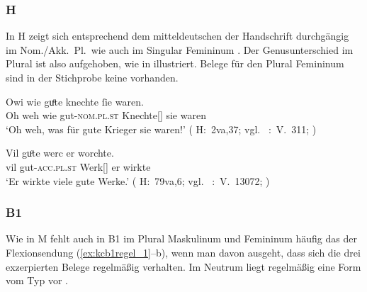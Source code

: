 \subsubsection{H}
In H zeigt sich entsprechend dem mitteldeutschen
 der Handschrift durch\-gängig  im
Nom./Akk.\ Pl.\ wie auch im Singular Femininum \autocite[vgl.][181--184]{ksw2}.
Der Genus\-unterschied im Plural ist also aufgehoben, wie in 
illustriert. Belege für den Plural Femininum sind in der Stichprobe keine
vorhanden.

\begin{exe}
\ex \label{ex:kchregel}
	\begin{xlist}
	\ex \label{ex:kchregel_1}
		\gll Owi wie guͦte knechte ſie waren. \\
			{Oh weh} wie gut-\textsc{nom.pl.st} Knechte[\MascM] sie waren \\
		\trans `Oh weh, was für gute Krieger sie waren!'
			(%
				H:~2va,37; vgl.~%
				\KC:~V.~311;
				\cite[85]{schroeder1895}%
			)

	\ex \label{ex:kchregel_2}
		\gll Vil guͦte werc er worchte. \\
			vil gut-\textsc{acc.pl.st} Werk[\NeutI] er wirkte \\
		\trans `Er wirkte viele gute Werke.'
			(%
				H:~79va,6; vgl.~%
				\KC:~V.~13072;
				\cite[318]{schroeder1895}%
			)
	\end{xlist}
\end{exe}

\subsubsection{B1}
Wie in M fehlt auch in B1 im Plural Maskulinum und Femininum häufig
das  der Flexionsendung (\ref{ex:kcb1regel_1}--b),
wenn man davon ausgeht, dass sich die drei exzerpierten Belege regelmäßig
verhalten. Im Neutrum liegt regelmäßig eine Form vom Typ  vor
.

